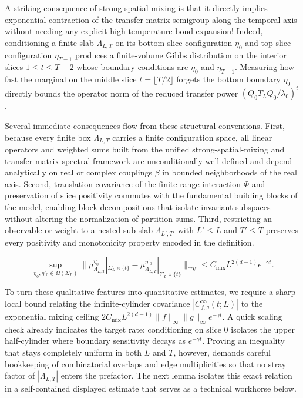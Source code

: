\documentclass[11pt]{article}
\theoremstyle{definition}
\begin{document}
A striking consequence of strong spatial mixing is that it directly implies
exponential contraction of the transfer-matrix semigroup along the temporal axis
without needing any explicit high-temperature bond expansion! Indeed, conditioning a
finite slab $\Lambda_{L, T}$ on its bottom slice configuration $\eta_0$ and top
slice configuration $\eta_{T-1}$ produces a finite-volume Gibbs distribution on the
interior slices $1 \le t \le T - 2$ whose boundary conditions are $\eta_0$ and
$\eta_{T-1}$. Measuring how fast the marginal on the middle slice $t = \lfloor T/2
\rfloor$ forgets the bottom boundary $\eta_0$ directly bounds the operator norm of
the reduced transfer power $(Q_0 T_L Q_0 / \lambda_0)^t$.

Several immediate consequences flow from these structural conventions. First,
because every finite box $\Lambda_{L,T}$ carries a finite configuration space, all
linear operators and weighted sums built from the unified strong-spatial-mixing and
transfer-matrix spectral framework are unconditionally well defined and depend
analytically on real or complex couplings $\beta$ in bounded neighborhoods of the
real axis. Second, translation covariance of the finite-range interaction $\Phi$ and
preservation of slice positivity commutes with the fundamental building blocks of
the model, enabling block decompositions that isolate invariant subspaces without
altering the normalization of partition sums. Third, restricting an observable or
weight to a nested sub-slab $\Lambda_{L',T'}$ with $L' \le L$ and $T' \le T$
preserves every positivity and monotonicity property encoded in the definition.

\[
  \sup_{\eta_0, \eta'_0 \in \Omega(\Sigma_L)} \bigl\|\mu_{\Lambda_{L,T}}^{\eta_0}|_{\Sigma_L \times \{t\}} - \mu_{\Lambda_{L,T}}^{\eta'_0}|_{\Sigma_L \times \{t\}}\bigr\|_{\mathrm{TV}} \le C_{\mathrm{mix}} L^{2(d-1)} e^{-\gamma t}.
\]

To turn these qualitative features into quantitative estimates, we require a sharp
local bound relating the infinite-cylinder covariance $|C_{f,g}^\infty(t; L)|$ to
the exponential mixing ceiling $2 C_{\mathrm{mix}} L^{2(d-1)} \|f\|_\infty
\|g\|_\infty e^{-\gamma t}$. A quick scaling check already indicates the target
rate: conditioning on slice $0$ isolates the upper half-cylinder where boundary
sensitivity decays as $e^{-\gamma t}$. Proving an inequality that stays completely
uniform in both $L$ and $T$, however, demands careful bookkeeping of combinatorial
overlaps and edge multiplicities so that no stray factor of $|\Lambda_{L,T}|$ enters
the prefactor. The next lemma isolates this exact relation in a self-contained
displayed estimate that serves as a technical workhorse below.
\end{document}
